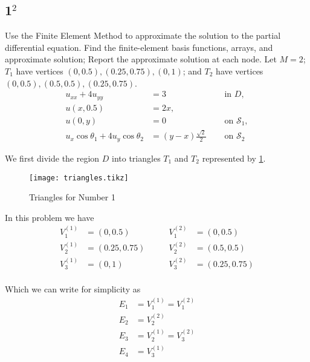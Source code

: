 \documentclass[12pt]{article}
\begin{document}
\subsection{1$^2$}
Use the Finite Element Method to approximate the solution to the
partial differential equation. Find the finite-element basis
functions, arrays, and approximate solution; Report the approximate
solution at each node. Let $M=2$; $T_1$ have vertices $(0,0.5),
(0.25,0.75), (0,1)$; and $T_2$ have vertices $(0,0.5), (0.5,0.5),
(0.25,0.75)$. 
\begin{equation}
  \label{eq:1_q}
  \begin{aligned}
    u_{xx}+4u_{yy} &= 3 &\quad\text{ in } D, \\
    u(x,0.5) &= 2x, \\
    u(0,y) &= 0 &\quad\text{ on } \mathcal{S}_1, \\
    u_{x}\cos\theta_1 + 4u_{y}\cos\theta_2 &= (y-x)\frac{\sqrt{2}}{2}
    &\quad\text{ on } \mathcal{S}_2
  \end{aligned}
\end{equation}

We first divide the region $D$ into triangles $T_1$ and $T_2$
represented by \cref{fig:tri}.
\begin{figure}[h]
  \centering
  \texttt{[image: triangles.tikz]}
  \caption{Triangles for Number 1}
  \label{fig:tri}
\end{figure}

In this problem we have 
\begin{equation}
  \label{eq:1_v}
  \begin{aligned}
    V_1^{(1)} &= (0,0.5)     &\qquad V_1^{(2)} &= (0,0.5) \\
    V_2^{(1)} &= (0.25,0.75) &\qquad V_2^{(2)} &= (0.5,0.5) \\
    V_3^{(1)} &= (0,1)       &\qquad V_3^{(2)} &= (0.25,0.75) \\
  \end{aligned}
\end{equation}

Which we can write for simplicity as
\begin{equation}
  \label{eq:1_e}
  \begin{aligned}
    E_1 &= V_1^{(1)} = V_1^{(2)} \\
    E_2 &= V_2^{(2)} \\
    E_3 &= V_2^{(1)} = V_3^{(2)} \\
    E_4 &= V_3^{(1)} \\
  \end{aligned}
\end{equation}
\end{document}
